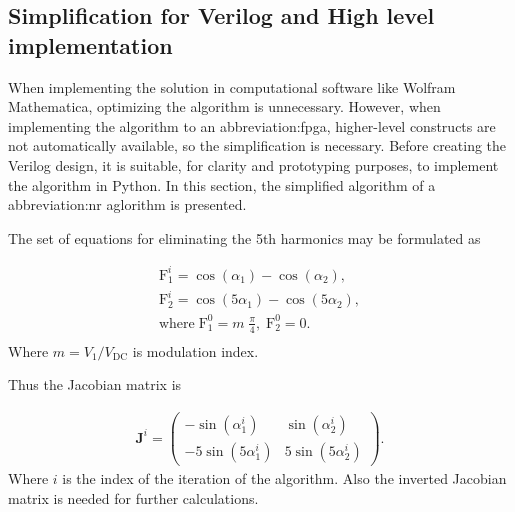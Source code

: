\documentclass[a4paper, twoside, 11pt]{article}
\begin{document}
    \subsection{Simplification for Verilog and High level implementation}\label{subsec:simplification-for-verilog-and-high-level-implementation}
        When implementing the solution in computational software like Wolfram Mathematica, optimizing the algorithm is unnecessary. However, when implementing the algorithm to an \gls{abbreviation:fpga}, higher-level constructs are not automatically available, so the simplification is necessary. Before creating the Verilog design, it is suitable, for clarity and prototyping purposes, to implement the algorithm in Python. In this section, the simplified algorithm of a \gls{abbreviation:nr} aglorithm is presented.\par

        The set of equations for eliminating the 5th harmonics may be formulated as

        \begin{equation}
            \begin{gathered}
                \mathrm{F}_1^i = \cos(\alpha_1) - \cos(\alpha_2),\\
                \mathrm{F}_2^i = \cos(5\alpha_1) - \cos(5\alpha_2),\\
                \mathrm{where} \; \mathrm{F}_1^0 = m \; \frac{\pi}{4},\; \mathrm{F}_2^0 = 0.\\
            \end{gathered}
        \end{equation}
        Where $m = V_1/V_{\mathrm{DC}}$ is modulation index.\par
        Thus the Jacobian matrix is

        \begin{equation}
            \begin{gathered}
                \textbf{J}^i = 
                \begin{pmatrix}
                    - \sin(\alpha_1^i) & \sin(\alpha_2^i)\\
                    - 5 \sin(5\alpha_1^i) & 5 \sin(5\alpha_2^i)
                \end{pmatrix}.
            \end{gathered}
        \end{equation}
        Where $i$ is the index of the iteration of the algorithm. Also the inverted Jacobian matrix is needed for further calculations.
\end{document}
